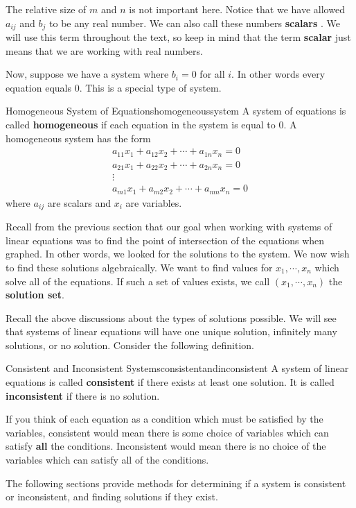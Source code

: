 The relative size of $m$ and $n$ is not important here. Notice that we
have allowed $a_{ij}$ and $b_{j}$ to be any real number.  We can also
call these numbers \textbf{scalars} . We will use this
term throughout the text, so keep in mind that the term
\textbf{scalar} just means that we are working with real numbers.

Now, suppose we have a system where $b_{i} = 0$ for all $i$. In other words every
equation equals $0$. This is a special type of system.

\begin{definition}{Homogeneous System of Equations}{homogeneoussystem}
A system of equations is called \textbf{homogeneous}  if each equation in
the system  is equal to $0$. A homogeneous system has the form 
\begin{equation*}
\begin{array}{c}
a_{11}x_{1}+a_{12}x_{2}+\cdots +a_{1n}x_{n}= 0 \\
a_{21}x_{1}+a_{22}x_{2}+\cdots +a_{2n}x_{n}= 0  \\
\vdots \\
a_{m1}x_{1}+a_{m2}x_{2}+\cdots +a_{mn}x_{n}= 0 
\end{array}
\end{equation*}
where $a_{ij}$ are scalars and $x_{i}$ are variables.
\end{definition}

Recall from the previous section that our goal when working with systems of linear equations 
was to find the point of intersection of the equations when graphed. In other words, we 
looked for the solutions to the system. We now wish to find these solutions algebraically. We want to find values for  
$ x_{1},\cdots ,x_{n} $ which solve all of
the equations. If such a set of values exists,  we call $\left( x_{1},\cdots ,x_{n}\right)$  the \textbf{solution set}.  

Recall the above discussions about the types of solutions possible. 
We will see that systems of linear equations will have one unique solution, infinitely many solutions, 
or no solution.  Consider the following definition. 

\begin{definition}{Consistent and Inconsistent Systems}{consistentandinconsistent}
A system of linear equations is called
 \textbf{consistent} if there exists at least one solution. It is
called
 \textbf{inconsistent }if there is no solution.
\end{definition}

If you think of each equation as a condition which must
be satisfied by the variables, consistent would mean there is some choice of
variables which can satisfy \textbf{all} the conditions. Inconsistent would mean
there is no choice of the variables which can satisfy all of the conditions.

The following sections provide methods for determining if a system is consistent or inconsistent, and finding
solutions if they exist.